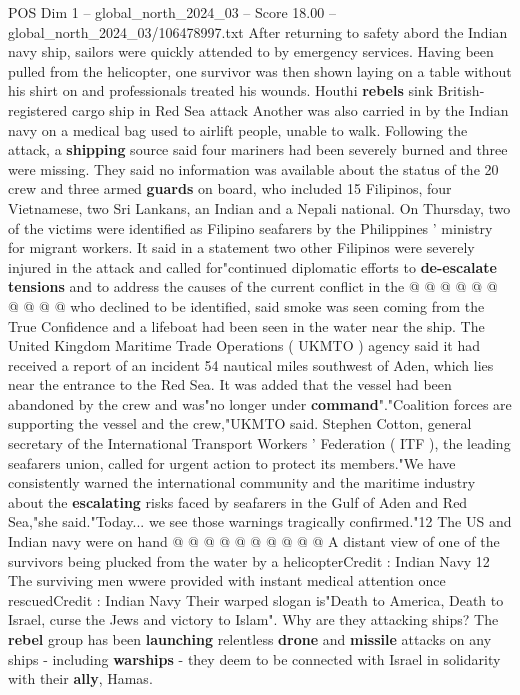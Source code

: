 \begin{textsample}{POS Dim 1 – global\_north\_2024\_03 – Score 18.00 – global\_north\_2024\_03/106478997.txt}  \label{ex:f1_pos_384}
After returning to safety abord the Indian navy ship, sailors were quickly attended to by emergency services.
Having been pulled from the helicopter, one survivor was then shown laying on a table without his shirt on and professionals treated his wounds.
Houthi \textbf{rebels} sink British-registered cargo ship in Red Sea attack Another was also carried in by the Indian navy on a medical bag used to airlift people, unable to walk.
Following the attack, a \textbf{shipping} source said four mariners had been severely burned and three were missing.
They said no information was available about the status of the 20 crew and three armed \textbf{guards} on board, who included 15 Filipinos, four Vietnamese, two Sri Lankans, an Indian and a Nepali national.
On Thursday, two of the victims were identified as Filipino seafarers by the Philippines ' ministry for migrant workers.
It said in a statement two other Filipinos were severely injured in the attack and called for"continued diplomatic efforts to \textbf{de-escalate} \textbf{tensions} and to address the causes of the current conflict in the @ @ @ @ @ @ @ @ @ @ who declined to be identified, said smoke was seen coming from the True Confidence and a lifeboat had been seen in the water near the ship.
The United Kingdom Maritime Trade Operations ( UKMTO ) agency said it had received a report of an incident 54 nautical miles southwest of Aden, which lies near the entrance to the Red Sea.
It was added that the vessel had been abandoned by the crew and was"no longer under \textbf{command}"."Coalition forces are supporting the vessel and the crew,"UKMTO said.
Stephen Cotton, general secretary of the International Transport Workers ' Federation ( ITF ), the leading seafarers union, called for urgent action to protect its members."We have consistently warned the international community and the maritime industry about the \textbf{escalating} risks faced by seafarers in the Gulf of Aden and Red Sea,"she said."Today... we see those warnings tragically confirmed."12 The US and Indian navy were on hand @ @ @ @ @ @ @ @ @ @ A distant view of one of the survivors being plucked from the water by a helicopterCredit : Indian Navy 12 The surviving men wwere provided with instant medical attention once rescuedCredit : Indian Navy Their warped slogan is"Death to America, Death to Israel, curse the Jews and victory to Islam".
Why are they attacking ships?
The \textbf{rebel} group has been \textbf{launching} relentless \textbf{drone} and \textbf{missile} attacks on any ships - including \textbf{warships} - they deem to be connected with Israel in solidarity with their \textbf{ally}, Hamas.

\end{textsample}
